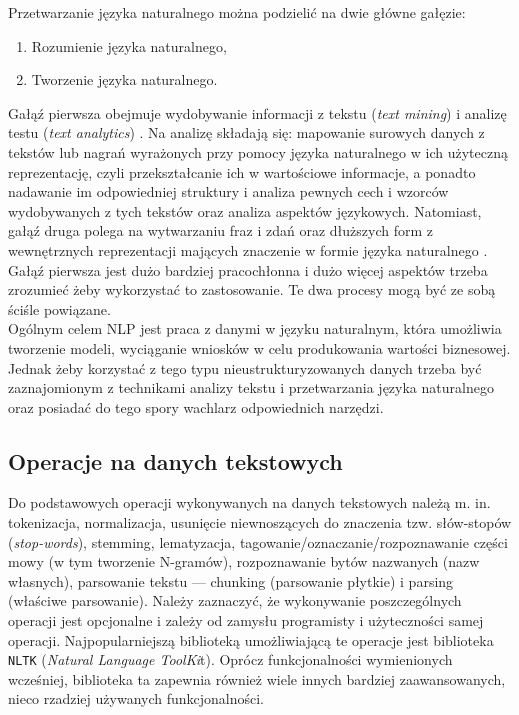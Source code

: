 \bigskip
\bigskip

\noindent Przetwarzanie języka naturalnego można podzielić na dwie główne gałęzie:
\begin{enumerate}
	\item Rozumienie języka naturalnego,
	\item Tworzenie języka naturalnego.
\end{enumerate}

\bigskip

\noindent Gałąź pierwsza obejmuje wydobywanie informacji z tekstu (\textit{text mining}) i analizę testu (\textit{text analytics}) \cite{wikipediaTM}. Na analizę składają się:
mapowanie surowych danych z tekstów lub nagrań wyrażonych przy pomocy języka naturalnego w ich użyteczną reprezentację, czyli przekształcanie ich w wartościowe informacje, a ponadto nadawanie im odpowiedniej struktury i analiza pewnych cech i wzorców wydobywanych z tych tekstów
oraz analiza aspektów językowych.
Natomiast, gałąź druga polega na wytwarzaniu fraz i zdań oraz dłuższych form  z wewnętrznych reprezentacji mających znaczenie w formie języka naturalnego \cite{wikipediaNLgeneration}.
Gałąź pierwsza jest dużo bardziej pracochłonna i dużo więcej aspektów trzeba zrozumieć żeby wykorzystać to zastosowanie.
Te dwa procesy mogą być ze sobą ściśle powiązane.
\\

\noindent Ogólnym celem NLP jest praca z danymi w języku naturalnym, która umożliwia tworzenie modeli, wyciąganie wniosków w celu produkowania wartości biznesowej.
Jednak żeby korzystać z tego typu nieustrukturyzowanych danych trzeba być zaznajomionym z technikami analizy tekstu i przetwarzania języka naturalnego oraz posiadać do tego spory wachlarz odpowiednich narzędzi.

\subsection{Operacje na danych tekstowych}
Do podstawowych operacji wykonywanych na danych tekstowych należą m. in. tokenizacja, normalizacja, usunięcie niewnoszących do znaczenia tzw. słów-stopów (\textit{stop-words}), stemming, lematyzacja, tagowanie/oznaczanie/rozpoznawanie części mowy (w tym tworzenie N-gramów), rozpoznawanie bytów nazwanych (nazw własnych), parsowanie tekstu --- chunking (parsowanie płytkie)
i parsing (właściwe parsowanie). Należy zaznaczyć, że wykonywanie poszczególnych operacji jest opcjonalne i zależy od zamysłu programisty i użyteczności samej operacji. Najpopularniejszą biblioteką umożliwiającą te operacje jest biblioteka \verb|NLTK| (\textit{Natural Language ToolKi}t). Oprócz funkcjonalności wymienionych wcześniej, biblioteka ta zapewnia również wiele innych bardziej zaawansowanych, nieco rzadziej używanych funkcjonalności.


